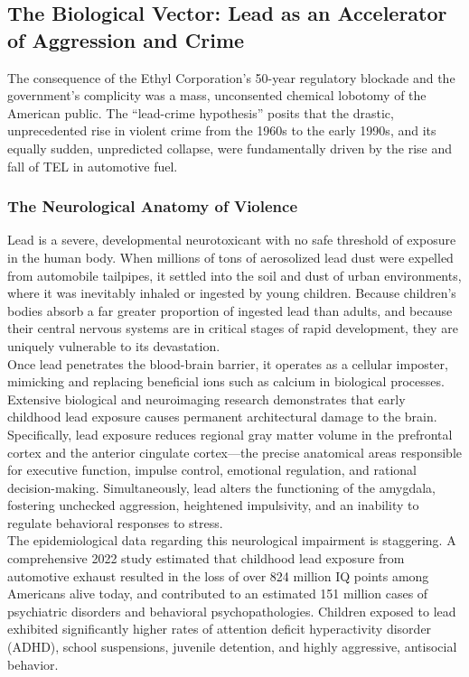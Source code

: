 \documentclass[
]{article}
\begin{document}
\subsection{\texorpdfstring{\textbf{The Biological Vector: Lead as an
Accelerator of Aggression and
Crime}}{The Biological Vector: Lead as an Accelerator of Aggression and Crime}}\label{the-biological-vector-lead-as-an-accelerator-of-aggression-and-crime}

The consequence of the Ethyl Corporation's 50-year regulatory blockade
and the government's complicity was a mass, unconsented chemical
lobotomy of the American public. The ``lead-crime hypothesis'' posits
that the drastic, unprecedented rise in violent crime from the 1960s to
the early 1990s, and its equally sudden, unpredicted collapse, were
fundamentally driven by the rise and fall of TEL in automotive fuel.

\subsubsection{\texorpdfstring{\textbf{The Neurological Anatomy of
Violence}}{The Neurological Anatomy of Violence}}\label{the-neurological-anatomy-of-violence}

Lead is a severe, developmental neurotoxicant with no safe threshold of
exposure in the human body. When millions of tons of aerosolized lead
dust were expelled from automobile tailpipes, it settled into the soil
and dust of urban environments, where it was inevitably inhaled or
ingested by young children. Because children's bodies absorb a far
greater proportion of ingested lead than adults, and because their
central nervous systems are in critical stages of rapid development,
they are uniquely vulnerable to its devastation.\\
Once lead penetrates the blood-brain barrier, it operates as a cellular
imposter, mimicking and replacing beneficial ions such as calcium in
biological processes. Extensive biological and neuroimaging research
demonstrates that early childhood lead exposure causes permanent
architectural damage to the brain. Specifically, lead exposure reduces
regional gray matter volume in the prefrontal cortex and the anterior
cingulate cortex---the precise anatomical areas responsible for
executive function, impulse control, emotional regulation, and rational
decision-making. Simultaneously, lead alters the functioning of the
amygdala, fostering unchecked aggression, heightened impulsivity, and an
inability to regulate behavioral responses to stress.\\
The epidemiological data regarding this neurological impairment is
staggering. A comprehensive 2022 study estimated that childhood lead
exposure from automotive exhaust resulted in the loss of over 824
million IQ points among Americans alive today, and contributed to an
estimated 151 million cases of psychiatric disorders and behavioral
psychopathologies. Children exposed to lead exhibited significantly
higher rates of attention deficit hyperactivity disorder (ADHD), school
suspensions, juvenile detention, and highly aggressive, antisocial
behavior.
\end{document}
